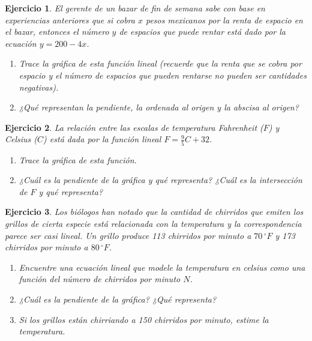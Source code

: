 \documentclass[12pt,tikz,border=5pt]{article}
\newtheorem{ejercicio}{Ejercicio}[section]
\begin{document}
\begin{ejercicio}
  El gerente de un bazar de fin de semana sabe con base en experiencias anteriores que si cobra $x$ pesos mexicanos por la renta de espacio en el bazar, entonces el número $y$ de espacios que puede rentar está dado por la ecuación $y = 200 - 4x$.
  \begin{enumerate}[label=(\alph*)]
    \item Trace la gráfica de esta función lineal (recuerde que la renta que se cobra por espacio y el número de espacios que pueden rentarse no pueden ser cantidades negativas).
    \item ¿Qué representan la pendiente, la ordenada al origen y la abscisa al origen?
  \end{enumerate}
\end{ejercicio}

\begin{ejercicio}
  La relación entre las escalas de temperatura Fahrenheit ($F$) y Celsius ($C$) está dada por la función lineal $F = \frac{9}{5} C + 32$.
  \begin{enumerate}[label=(\alph*)]
    \item Trace la gráfica de esta función.
    \item ¿Cuál es la pendiente de la gráfica y qué representa? ¿Cuál es la intersección de $F$ y qué representa? 
  \end{enumerate}
\end{ejercicio}

\begin{ejercicio}
  Los biólogos han notado que la cantidad de chirridos que emiten los grillos de cierta especie está relacionada con la temperatura y la correspondencia parece ser casi lineal. Un grillo produce 113 chirridos por minuto a $70 \, ^{\circ}F$ y 173 chirridos por minuto a $80 \, ^{\circ}F$.
  \begin{enumerate}[label=(\alph*)]
    \item Encuentre una ecuación lineal que modele la temperatura en celsius como una función del número de chirridos por minuto $N$.
    \item ¿Cuál es la pendiente de la gráfica? ¿Qué representa? 
    \item Si los grillos están chirriando a 150 chirridos por minuto, estime la temperatura.
  \end{enumerate}
\end{ejercicio}
\end{document}
